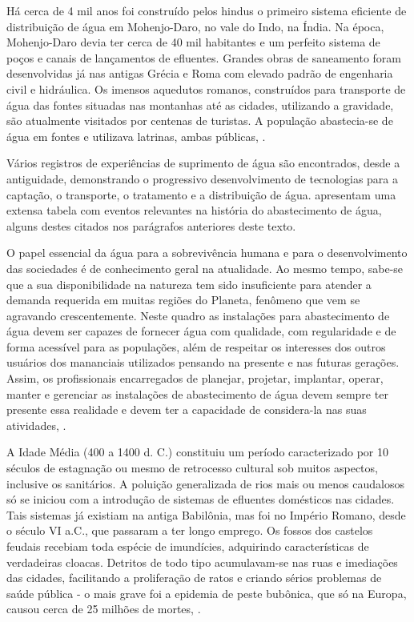 \documentclass[
	12pt,				%
	openright,			%
	twoside,			%
	a4paper,			%
	english,			%
	french,				%
	spanish,			%
	brazil				%
	]{abntex2}
\begin{document}
Há cerca de 4 mil anos foi construído pelos hindus o primeiro sistema eficiente de distribuição de água em Mohenjo-Daro, no vale do Indo, na Índia. Na época, Mohenjo-Daro devia ter cerca de 40 mil habitantes e um perfeito sistema de poços e canais de lançamentos de efluentes. Grandes obras de saneamento foram desenvolvidas já nas antigas Grécia e Roma com elevado padrão de engenharia civil e hidráulica. Os imensos aquedutos romanos, construídos para transporte de água das fontes situadas nas montanhas até as cidades, utilizando a gravidade, são atualmente visitados por centenas de turistas. A população abastecia-se de água em fontes e utilizava latrinas, ambas públicas, \cite{rocha2009}. 

Vários registros de experiências de suprimento de água são encontrados, desde a antiguidade, demonstrando o progressivo desenvolvimento de tecnologias para a captação, o transporte, o tratamento e a distribuição de água.  apresentam uma extensa tabela com eventos relevantes na história do abastecimento de água, alguns destes citados nos parágrafos anteriores deste texto.

O papel essencial da água para a sobrevivência humana e para o desenvolvimento das sociedades é de conhecimento geral na atualidade. Ao mesmo tempo, sabe-se que a sua disponibilidade na natureza tem sido insuficiente para atender a demanda requerida em muitas regiões do Planeta, fenômeno que vem se agravando crescentemente. Neste quadro as instalações para abastecimento de água devem ser capazes de fornecer água com qualidade, com regularidade e de forma acessível para as populações, além de respeitar os interesses dos outros usuários dos mananciais utilizados pensando na presente e nas futuras gerações. Assim, os profissionais encarregados de planejar, projetar, implantar, operar, manter e gerenciar as instalações de abastecimento de água devem sempre ter presente essa realidade e devem ter a capacidade de considera-la nas suas atividades, .

A Idade Média (400 a 1400 d. C.) constituiu um período caracterizado por 10 séculos de estagnação ou mesmo de retrocesso cultural sob muitos aspectos, inclusive os sanitários. A poluição generalizada de rios mais ou menos caudalosos só se iniciou com a introdução de sistemas de efluentes domésticos nas cidades. Tais sistemas já existiam na antiga Babilônia, mas foi no Império Romano, desde o século VI a.C., que passaram a ter longo emprego. Os fossos dos castelos feudais recebiam toda espécie de imundícies, adquirindo características de verdadeiras cloacas. Detritos de todo tipo acumulavam-se nas ruas e imediações das cidades, facilitando a proliferação de ratos e criando sérios problemas de saúde pública - o mais grave foi a epidemia de peste bubônica, que só na Europa, causou cerca de 25 milhões de mortes, \cite{rocha2009}.
\end{document}
